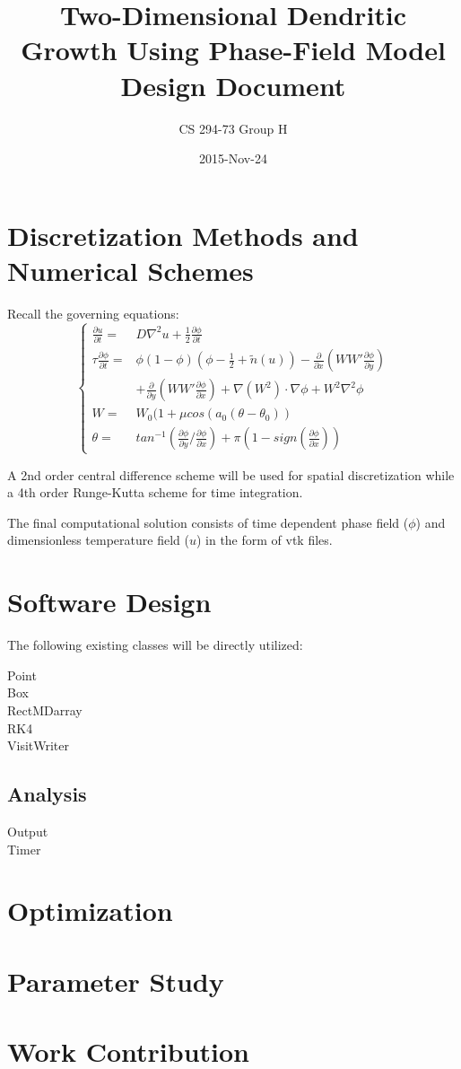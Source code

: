 \documentclass{article}
\title{Two-Dimensional Dendritic Growth Using Phase-Field Model \\ Design Document}
\date{2015-Nov-24}
\author{CS 294-73 Group H}
\begin{document}
\maketitle
    
\section{Discretization Methods and Numerical Schemes}
Recall the governing equations:
\begin{equation}
\begin{cases}
\frac{\partial u}{\partial t} =&D\nabla^2u+\frac{1}{2}\frac{\partial\phi}{\partial t} \\
\tau\frac{\partial \phi}{\partial t} =&  \phi(1-\phi)(\phi-\frac{1}{2}+\tilde{n}(u)) - \frac{\partial}{\partial x}(WW'\frac{\partial\phi}{\partial y})\\
&  + \frac{\partial}{\partial y}(WW'\frac{\partial\phi}{\partial x}) + \nabla(W^2)\cdot\nabla\phi + W^2\nabla^2\phi \\
W = & W_0(1+\mu cos(a_0(\theta-\theta_0)) \\
\theta = & tan^{-1}(\frac{\partial\phi}{\partial y}/\frac{\partial\phi}{\partial x}) + \pi(1-sign(\frac{\partial\phi}{\partial x})) 
\end{cases}
\end{equation}

A 2nd order central difference scheme will be used for spatial discretization while a 4th order Runge-Kutta scheme for time integration. 

The final computational solution consists of time dependent phase field ($\phi$) and dimensionless temperature field ($u$) in the form of vtk files.

\section{Software Design}
The following existing classes will be directly utilized:
\begin{description}
\item[Point]
\item[Box]
\item[RectMDarray]
\item[RK4]
\item[VisitWriter]
\item[]
\end{description}

\subsection{Analysis}
\begin{description}
\item[Output]
\item[Timer]
\end{description} 
	
\section{Optimization}
\section{Parameter Study} 
\section{Work Contribution} 
\end{document}
